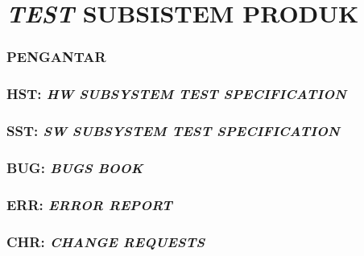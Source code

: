 \part*{\centering\textsf{\large \textit{TEST} SUBSISTEM PRODUK}}


\section*{\textcolor{sectioncolor}{\textsf{\large PENGANTAR}}}







\section*{\textcolor{sectioncolor}{\textsf{\large HST: \textit{HW SUBSYSTEM TEST SPECIFICATION}}}}








\section*{\textcolor{sectioncolor}{\textsf{\large SST: \textit{SW SUBSYSTEM TEST SPECIFICATION}}}}








\section*{\textcolor{sectioncolor}{\textsf{\large BUG: \textit{BUGS BOOK}}}}


\section*{\textcolor{sectioncolor}{\textsf{\large ERR: \textit{ERROR REPORT}}}}


\section*{\textcolor{sectioncolor}{\textsf{\large CHR: \textit{CHANGE REQUESTS}}}}






\appendix
{}
